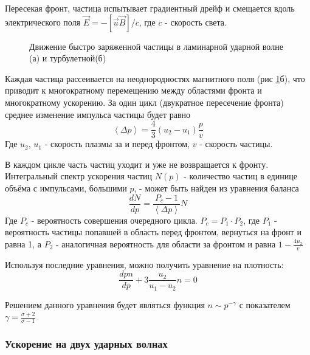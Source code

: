 \documentclass[a4paper,14pt]{extarticle} %
\begin{document}
Пересекая фронт, частица испытывает градиентный дрейф и смещается вдоль электрического поля
$\vec{E} = - [\vec{u}\vec{B}]/c$, где $c$ - скорость света.

\begin{figure}[htbp]
  \centering
  
  \caption{\label{intro/lam} Движение быстро заряженной частицы в ламинарной ударной волне (а) и турбулетной(б)}
\end{figure}
Каждая частица рассеивается на неоднородностях магнитного поля (рис \ref{intro/lam}б), что приводит к многократному перемещению между областями фронта и многократному ускорению. За один цикл (двукратное пересечение фронта) среднее изменение импульса частицы будет равно
\begin{equation}
\left< \Delta p \right> = \frac{4}{3} (u_2-u_1)\frac{p}{v}
\end{equation}
Где $u_2$, $u_1$ - скорость плазмы за и перед фронтом, $v$ - скорость частицы.

В каждом цикле часть частиц уходит и уже не возвращается к фронту. Интегральный спектр ускорения частиц $N(p)$ - количество частиц в единице объёма с импульсами, большими $p$,  - может быть найден из уравнения баланса
\begin{equation}
\frac{dN}{dp}=\frac{P_c-1}{\left<\Delta p \right>}N
\end{equation}
Где $P_c$ - вероятность совершения очередного цикла. $P_c=P_1 \cdot P_2$, где $P_1$ - вероятность частицы попавшей в область перед фронтом, вернуться на фронт и равна 1, а $P_2$ - аналогичная вероятность для области за фронтом и равна $1-\frac{4u_2}{v}$

Используя последние уравнения, можно получить уравнение на плотность:
\begin{equation}
\frac{d pn}{dp} + 3 \frac{u_2}{u_1-u_2} n = 0
\end{equation}

Решением данного уравнения будет являться функция $n \sim p^{-\gamma}$ с показателем $\gamma=\frac{\sigma+2}{\sigma-1}$

\subsubsection{Ускорение на двух ударных волнах}
\end{document}
